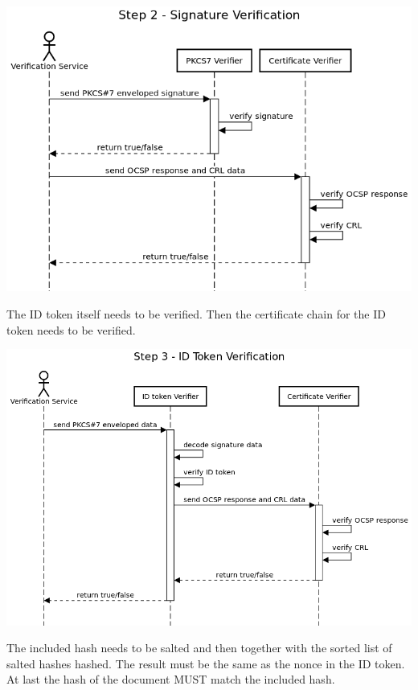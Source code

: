 \includegraphics[scale=0.5]{images/protocol_verification_step2_signature.png}

The ID token itself needs to be verified.
Then the certificate chain for the ID token needs to be verified.

\includegraphics[scale=0.5]{images/protocol_verification_step3_id_token.png}

The included hash needs to be salted and then together with the sorted list of salted hashes hashed.
The result must be the same as the nonce in the ID token.
At last the hash of the document MUST match the included hash.

